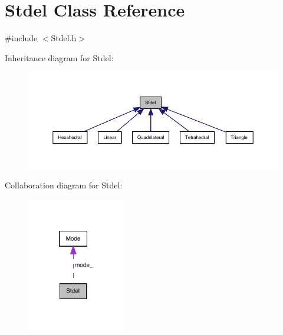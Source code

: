 \hypertarget{classStdel}{}\section{Stdel Class Reference}
\label{classStdel}


{\ttfamily \#include $<$Stdel.\+h$>$}



Inheritance diagram for Stdel\+:
\nopagebreak
\begin{figure}[H]
\begin{center}
\leavevmode
\includegraphics[width=350pt]{classStdel__inherit__graph}
\end{center}
\end{figure}


Collaboration diagram for Stdel\+:
\nopagebreak
\begin{figure}[H]
\begin{center}
\leavevmode
\includegraphics[width=124pt]{classStdel__coll__graph}
\end{center}
\end{figure}
